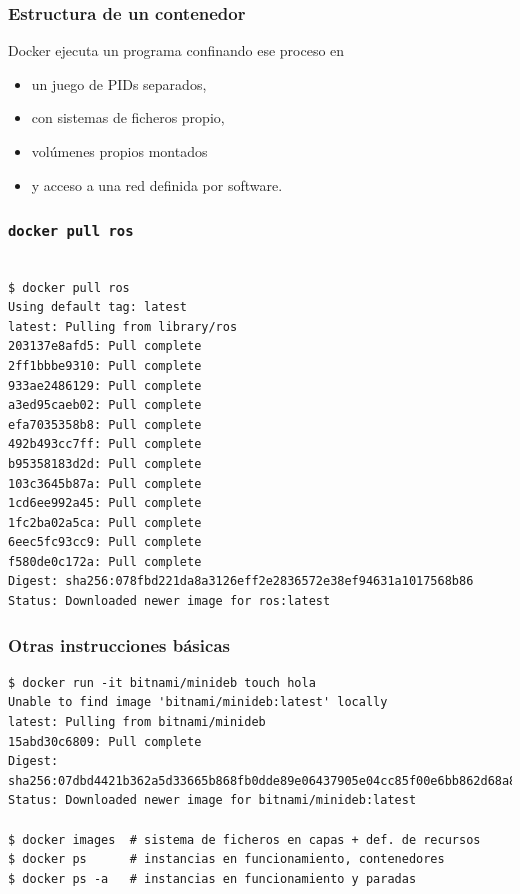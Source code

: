 \documentclass[xcolor=dvipsnames]{beamer}
\begin{document}
\begin{frame}[fragile]
	\frametitle{Estructura de un contenedor}

			Docker ejecuta un programa confinando ese proceso en 
			
\begin{itemize}
	\item 	un juego de PIDs separados, 
	\item con sistemas de ficheros propio, 
	\item volúmenes propios montados
	\item  y acceso a una red definida por software.
\end{itemize}
			
		
\end{frame}

\begin{frame}[fragile]
	\frametitle{\texttt{docker pull ros}}
		\begin{lstlisting}

$ docker pull ros
Using default tag: latest
latest: Pulling from library/ros
203137e8afd5: Pull complete 
2ff1bbbe9310: Pull complete 
933ae2486129: Pull complete 
a3ed95caeb02: Pull complete 
efa7035358b8: Pull complete 
492b493cc7ff: Pull complete 
b95358183d2d: Pull complete 
103c3645b87a: Pull complete 
1cd6ee992a45: Pull complete 
1fc2ba02a5ca: Pull complete 
6eec5fc93cc9: Pull complete 
f580de0c172a: Pull complete 
Digest: sha256:078fbd221da8a3126eff2e2836572e38ef94631a1017568b86
Status: Downloaded newer image for ros:latest

		\end{lstlisting}
\end{frame}


\begin{frame}[fragile]
	\frametitle{Otras instrucciones básicas}
		\begin{lstlisting}
$ docker run -it bitnami/minideb touch hola       
Unable to find image 'bitnami/minideb:latest' locally
latest: Pulling from bitnami/minideb
15abd30c6809: Pull complete 
Digest: sha256:07dbd4421b362a5d33665b868fb0dde89e06437905e04cc85f00e6bb862d68a8
Status: Downloaded newer image for bitnami/minideb:latest

$ docker images  # sistema de ficheros en capas + def. de recursos
$ docker ps 	 # instancias en funcionamiento, contenedores
$ docker ps -a   # instancias en funcionamiento y paradas

		\end{lstlisting}
\end{frame}
\end{document}
